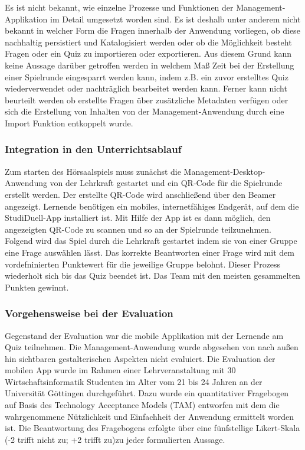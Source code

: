\documentclass[conference]{IEEEtran}
\begin{document}
Es ist nicht bekannt, wie einzelne Prozesse und Funktionen der Management-Applikation im Detail umgesetzt worden sind. Es ist deshalb unter anderem nicht bekannt in welcher Form die Fragen innerhalb der Anwendung vorliegen, ob diese nachhaltig persistiert und Katalogisiert werden oder ob die Möglichkeit besteht Fragen oder ein Quiz zu importieren oder exportieren. Aus diesem Grund kann keine Aussage darüber getroffen werden in welchem Maß Zeit bei der Erstellung einer Spielrunde eingesparrt werden kann, indem z.B. ein zuvor erstelltes Quiz wiederverwendet oder nachträglich bearbeitet werden kann. Ferner kann nicht beurteilt werden ob erstellte Fragen über zusätzliche Metadaten verfügen oder sich die Erstellung von Inhalten von der Management-Anwendung durch eine Import Funktion entkoppelt wurde. 
\\
\subsubsection{Integration in den Unterrichtsablauf}
Zum starten des Hörsaalspiels muss zunächst die Management-Desktop-Anwendung von der Lehrkraft gestartet und ein QR-Code für die Spielrunde erstellt werden. Der erstellte QR-Code wird anschließend über den Beamer angezeigt. Lernende benötigen ein mobiles, internetfähiges Endgerät, auf dem die StudiDuell-App installiert ist. Mit Hilfe der App ist es dann möglich, den angezeigten QR-Code zu scannen und so an der Spielrunde teilzunehmen. Folgend wird das Spiel durch die Lehrkraft gestartet indem sie von einer Gruppe eine Frage auswählen lässt. Das korrekte Beantworten einer Frage wird mit dem vordefninierten Punktewert für die jeweilige Gruppe belohnt. Dieser Prozess wiederholt sich bis das Quiz beendet ist. Das Team mit den meisten gesammelten Punkten gewinnt. \cite[p. 340f]{Hobert2017}
\\
\subsubsection{Vorgehensweise bei der Evaluation}
Gegenstand der Evaluation war die mobile Applikation mit der Lernende am Quiz teilnehmen. Die Management-Anwendung wurde abgesehen von nach außen hin sichtbaren gestalterischen Aspekten nicht evaluiert. Die Evaluation der mobilen App wurde im Rahmen einer Lehrveranstaltung mit 30 Wirtschaftsinformatik Studenten im Alter vom 21 bis 24 Jahren an der Universität Göttingen durchgeführt. Dazu wurde ein quantitativer Fragebogen auf Basis des Technology Acceptance Models (TAM) \cite[p. 985]{Davis1989} entworfen mit dem die wahrgenommene Nützlichkeit und Einfachheit der Anwendung ermittelt worden ist. Die Beantwortung des Fragebogens erfolgte über eine fünfstellige Likert-Skala (-2 trifft nicht zu; +2 trifft zu)zu jeder formulierten Aussage.\cite[p. 342]{Hobert2017}
\end{document}
